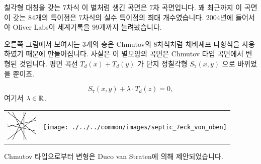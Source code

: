 \begin{surferPage}{칠각형 대칭을 갖는 $7$차식}
    이 별처럼 생긴 곡면은 $7$차 곡면입니다. 꽤 최근까지 이 곡면이 갖는 $84$개의 특이점은 $7$차식의 실수 특이점의 최대 개수였습니다. $2004$년에 들어서야 Oliver Labs이 세계기록을 $99$개까지 늘려놨습니다.
  
  
오른쪽 그림에서 보여지는 $3$개의 층은 Chmutov의 $8$차식처럼 체비셰프 다항식을 사용하였기 때문에 만들어집니다. 사실은 이 별모양의 곡면은 Chmutov 타입 곡면에서 변형된 것입니다. 평면 곡선 $T_d(x)+T_d(y)$ 가 단지 정칠각형 $S_7(x,y)$ 으로 바뀌었을 뿐이죠. 
   
   \[S_7(x,y) + \lambda \cdot T_d(z) = 0,\]
    여기서 $\lambda\in{\mathbb R}$. 
    \vspace*{-0.3em}
    \begin{center}
      \begin{tabular}{c@{\qquad}c}
        \includegraphics[height=1.5cm]{./../../common/images/labsseptic1.pdf}
        &
        \texttt{[image: ./../../common/images/septic\_7eck\_von\_oben]}
      \end{tabular}
    \end{center}
    \vspace*{-0.3em}   
Chmutov 타입으로부터 변형은 Duco van Straten에 의해 제안되었습니다.
\end{surferPage}
